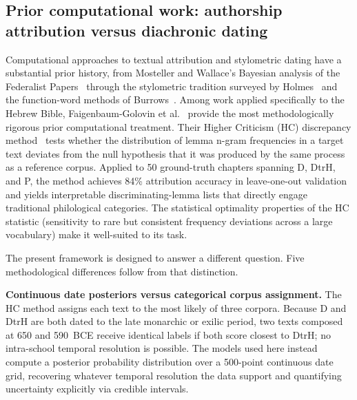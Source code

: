 \documentclass[10pt,letterpaper]{article}
\begin{document}
\subsection*{Prior computational work: authorship attribution versus
diachronic dating}

Computational approaches to textual attribution and stylometric dating have a substantial prior history, from Mosteller and Wallace's Bayesian analysis of the Federalist Papers~\cite{Mosteller1984} through the stylometric tradition surveyed by Holmes~\cite{Holmes1998} and the function-word methods of Burrows~\cite{Burrows2002}.  Among work applied specifically to the Hebrew Bible, Faigenbaum-Golovin et al.~\cite{Faigenbaum2025} provide the most
methodologically rigorous prior computational treatment.
Their Higher Criticism (HC) discrepancy method~\cite{Faigenbaum2025} tests
whether the distribution of lemma n-gram frequencies in a target text
deviates from the null hypothesis that it was produced by the same process
as a reference corpus.  Applied to 50 ground-truth chapters spanning D,
DtrH, and P, the method achieves 84\% attribution accuracy in leave-one-out
validation and yields interpretable discriminating-lemma lists that directly
engage traditional philological categories.  The statistical
optimality properties of the HC statistic (sensitivity to rare but
consistent frequency deviations across a large vocabulary) make it
well-suited to its task.

The present framework is designed to answer a different question.
Five methodological differences follow from that distinction.

\textbf{Continuous date posteriors versus categorical corpus assignment.}
The HC method assigns each text to the most likely of three corpora.
Because D and DtrH are both dated to the late monarchic or exilic period,
two texts composed at 650 and 590~BCE receive identical labels if both
score closest to DtrH; no intra-school temporal resolution is possible.
The models used here instead compute a posterior probability
distribution over a 500-point continuous date grid, recovering whatever
temporal resolution the data support and quantifying uncertainty explicitly
via credible intervals.
\end{document}
